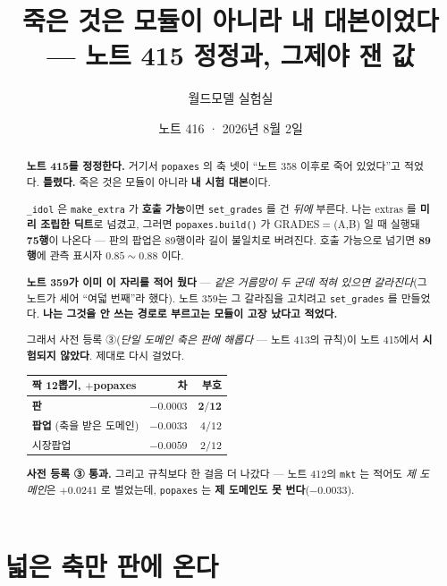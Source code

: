 \documentclass[11pt]{article}
\begin{document}
\title{죽은 것은 모듈이 아니라 내 대본이었다 --- 노트 415 정정과, 그제야 잰 값}
\author{월드모델 실험실}
\date{노트 416 · 2026년 8월 2일}
\maketitle

\begin{abstract}
\textbf{노트 415를 정정한다.} 거기서 \texttt{popaxes} 의 축 넷이 ``노트 358
이후로 죽어 있었다''고 적었다. \textbf{틀렸다.} 죽은 것은 모듈이 아니라
\textbf{내 시험 대본}이다.

\texttt{\_idol} 은 \texttt{make\_extra} 가 \textbf{호출 가능}이면
\texttt{set\_grades} 를 건 \emph{뒤에} 부른다. 나는 extras 를 \textbf{미리
조립한 딕트}로 넘겼고, 그러면 \texttt{popaxes.build()} 가 GRADES$=$(A,B)
일 때 실행돼 \textbf{75행}이 나온다 --- 판의 팝업은 89행이라 길이 불일치로
버려진다. 호출 가능으로 넘기면 \textbf{89행}에 관측 표시자 $0.85 \sim 0.88$
이다.

\textbf{노트 359가 이미 이 자리를 적어 뒀다} --- \emph{같은 거름망이 두 군데
적혀 있으면 갈라진다}(그 노트가 세어 ``여덟 번째''라 했다). 노트 359는 그
갈라짐을 고치려고 \texttt{set\_grades} 를 만들었다. \textbf{나는 그것을 안
쓰는 경로로 부르고는 모듈이 고장 났다고 적었다.}

그래서 사전 등록 ③(\emph{단일 도메인 축은 판에 해롭다} --- 노트 413의 규칙)이
노트 415에서 \textbf{시험되지 않았다}. 제대로 다시 걸었다.

\begin{center}
\begin{tabular}{lrr}
\hline
짝 12뽑기, $+$popaxes & 차 & 부호 \\
\hline
\textbf{판} & $\mathbf{-0.0003}$ & $\mathbf{2/12}$ \\
\textbf{팝업} (축을 받은 도메인) & $\mathbf{-0.0033}$ & $4/12$ \\
시장팝업 & $-0.0059$ & $2/12$ \\
\hline
\end{tabular}
\end{center}

\textbf{사전 등록 ③ 통과.} 그리고 규칙보다 한 걸음 더 나갔다 --- 노트 412의
\texttt{mkt} 는 적어도 \emph{제 도메인}은 $+0.0241$ 로 벌었는데,
\texttt{popaxes} 는 \textbf{제 도메인도 못 번다}($-0.0033$).
\end{abstract}

\section{넓은 축만 판에 온다}
\end{document}
